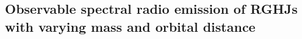 \documentclass{emulateapj}
\def\memoYF#1{\color{red}$[${\bf #1}$]$ \color{black}}
\begin{document}

\subsection{Observable spectral radio emission of RGHJs with varying mass and orbital distance}
\end{document}
